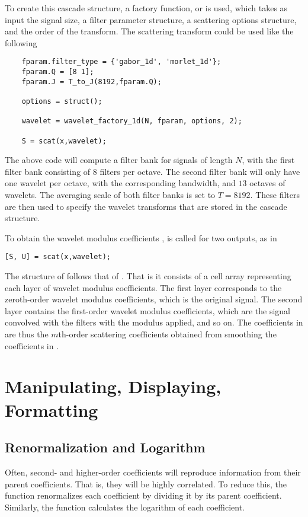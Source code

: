 \documentclass[twocolumn]{article}
\begin{document}
To create this cascade structure, a factory function,  or  is used, which takes as input the signal size, a filter parameter structure, a scattering options structure, and the order of the transform. The scattering transform could be used like the following
\begin{lstlisting}
	fparam.filter_type = {'gabor_1d', 'morlet_1d'};
	fparam.Q = [8 1];
	fparam.J = T_to_J(8192,fparam.Q);
	
	options = struct();
	
	wavelet = wavelet_factory_1d(N, fparam, options, 2);
	
	S = scat(x,wavelet);
\end{lstlisting}
The above code will compute a filter bank for signals of length $N$, with the first filter bank consisting of $8$ filters per octave. The second filter bank will only have one wavelet per octave, with the corresponding bandwidth, and $13$ octaves of wavelets. The averaging scale of both filter banks is set to $T = 8192$. These filters are then used to specify the wavelet transforms that are stored in the cascade structure.

To obtain the wavelet modulus coefficients ,  is called for two outputs, as in
\begin{lstlisting}
[S, U] = scat(x,wavelet);
\end{lstlisting}
The structure of  follows that of . That is it consists of a cell array representing each layer of wavelet modulus coefficients. The first layer corresponds to the zeroth-order wavelet modulus coefficients, which is the original signal. The second layer contains the first-order wavelet modulus coefficients, which are the signal convolved with the filters with the modulus applied, and so on. The coefficients in  are thus the $m$th-order scattering coefficients obtained from smoothing the coefficients in .

\section{Manipulating, Displaying, Formatting}

\subsection{Renormalization and Logarithm}
Often, second- and higher-order coefficients will reproduce information from their parent coefficients. That is, they will be highly correlated. To reduce this, the  function renormalizes each coefficient by dividing it by its parent coefficient. Similarly, the  function calculates the logarithm of each coefficient.
\end{document}
